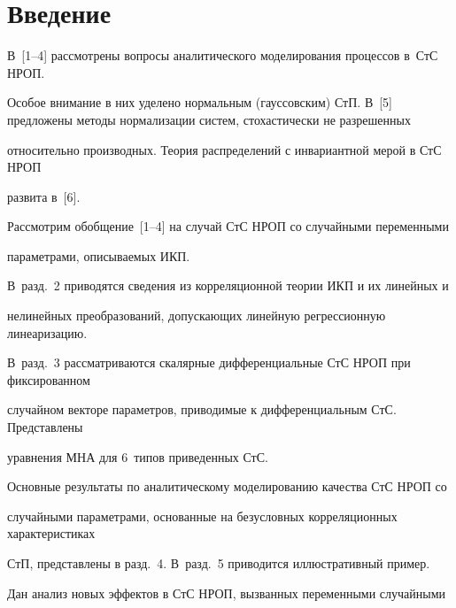 





 \thispagestyle{headings}

 

 \vspace*{-18pt}



\section{Введение}



\vspace*{-3pt}





В~[1--4] рассмотрены вопросы аналитического моделирования процессов в~СтС НРОП. 

Особое внимание в них уделено нормальным (гауссовским) СтП. В~[5] предложены методы нормализации систем, стохастически не разрешенных 

относительно производных. Теория распределений с инвариантной мерой в СтС НРОП 

развита в~[6].



Рассмотрим обобщение~[1--4] на случай СтС НРОП со случайными переменными 

параметрами, описываемых ИКП.

В~разд.~2 приводятся сведения из корреляционной теории ИКП и их линейных и 

нелинейных преобразований, допускающих линейную регрессионную линеаризацию. 

В~разд.~3 рассматриваются скалярные дифференциальные СтС НРОП при фиксированном 

случайном векторе параметров, приводимые к дифференциальным СтС. Представлены 

уравнения МНА для 6~типов приведенных СтС. 

Основные результаты по аналитическому моделированию качества СтС НРОП со 

случайными параметрами, основанные на безусловных корреляционных характеристиках 

СтП, представлены в разд.~4. В~разд.~5 приводится иллюстративный пример. 

Дан анализ новых эффектов в СтС НРОП, вызванных переменными случайными 


